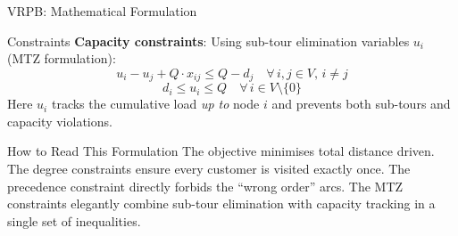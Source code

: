 \documentclass[aspectratio=169,10pt]{beamer}
\begin{document}
\begin{frame}[allowframebreaks]{VRPB: Mathematical Formulation}
\begin{block}{Constraints}
  \textbf{Capacity constraints}:
  Using sub-tour elimination variables $u_i$ (MTZ formulation):
  \[
    u_i - u_j + Q \cdot x_{ij} \leq Q - d_j \quad \forall\, i,j \in V,\, i \neq j
  \]
  \[
    d_i \leq u_i \leq Q \quad \forall\, i \in V \setminus \{0\}
  \]
  Here $u_i$ tracks the cumulative load \emph{up to} node $i$ and prevents
  both sub-tours and capacity violations.
\end{block}

\begin{alertblock}{How to Read This Formulation}
  The objective minimises total distance driven.  The degree constraints
  ensure every customer is visited exactly once.  The precedence constraint
  directly forbids the ``wrong order'' arcs.  The MTZ constraints elegantly
  combine sub-tour elimination with capacity tracking in a single set of
  inequalities.
\end{alertblock}

\end{frame}
\end{document}
